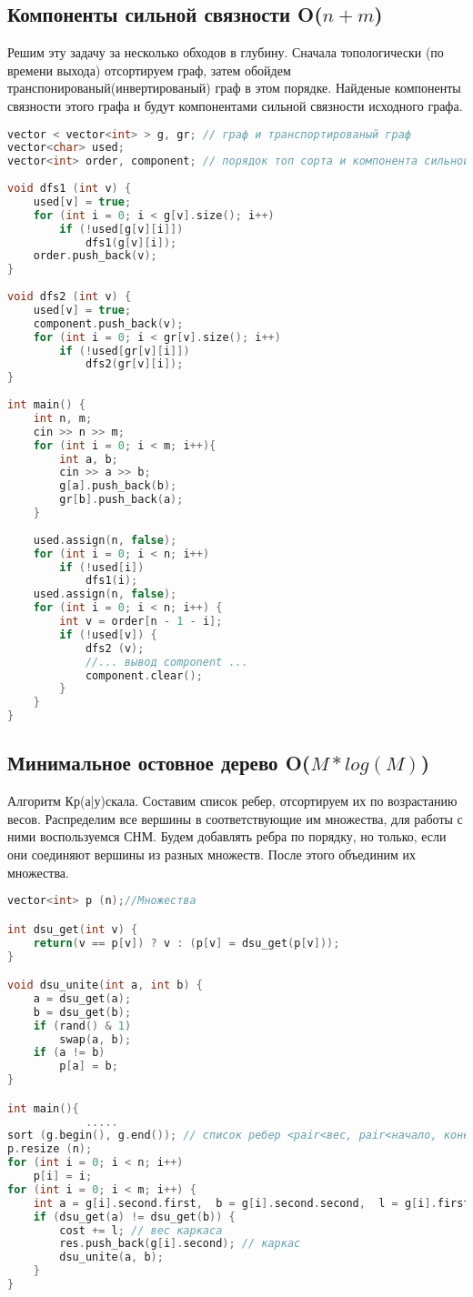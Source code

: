 \subsection{Компоненты сильной связности O($n+m$)}
Решим эту задачу за несколько обходов в глубину. Сначала топологически (по времени выхода) отсортируем граф, затем обойдем транспонированый(инвертированый) граф в этом порядке. Найденые компоненты связности этого графа и будут компонентами сильной связности исходного графа.
\begin{lstlisting}[language=C++]
vector < vector<int> > g, gr; // граф и транспортированый граф
vector<char> used;
vector<int> order, component; // порядок топ сорта и компонента сильной связности
 
void dfs1 (int v) {
	used[v] = true;
	for (int i = 0; i < g[v].size(); i++)
		if (!used[g[v][i]])
			dfs1(g[v][i]);
	order.push_back(v);
}
 
void dfs2 (int v) {
	used[v] = true;
	component.push_back(v);
	for (int i = 0; i < gr[v].size(); i++)
		if (!used[gr[v][i]])
			dfs2(gr[v][i]);
}
 
int main() {
	int n, m;
	cin >> n >> m;
	for (int i = 0; i < m; i++){
		int a, b;
		cin >> a >> b;
		g[a].push_back(b);
		gr[b].push_back(a);
	}
 
	used.assign(n, false);
	for (int i = 0; i < n; i++)
		if (!used[i])
			dfs1(i);
	used.assign(n, false);
	for (int i = 0; i < n; i++) {
		int v = order[n - 1 - i];
		if (!used[v]) {
			dfs2 (v);
			//... вывод component ...
			component.clear();
		}
	}
}
\end{lstlisting}
\subsection{Минимальное остовное дерево O($M*log(M)$)}
Алгоритм Кр(а|у)скала. Составим список ребер, отсортируем их по возрастанию весов. Распределим все вершины в соответствующие им множества, для работы с ними воспользуемся СНМ. Будем добавлять ребра по порядку, но только, если они соединяют вершины из разных множеств. После этого объединим их множества.
\begin{lstlisting}[language=C++]
vector<int> p (n);//Множества

int dsu_get(int v) {
	return(v == p[v]) ? v : (p[v] = dsu_get(p[v]));
}

void dsu_unite(int a, int b) {
	a = dsu_get(a);
	b = dsu_get(b);
	if (rand() & 1)
		swap(a, b);
	if (a != b)
		p[a] = b;
}

int main(){
            .....
sort (g.begin(), g.end()); // список ребер <pair<вес, pair<начало, конец> > > 
p.resize (n);
for (int i = 0; i < n; i++)
	p[i] = i;
for (int i = 0; i < m; i++) {
	int a = g[i].second.first,  b = g[i].second.second,  l = g[i].first;
	if (dsu_get(a) != dsu_get(b)) {
		cost += l; // вес каркаса
		res.push_back(g[i].second); // каркас
		dsu_unite(a, b);
	}
}
\end{lstlisting}
